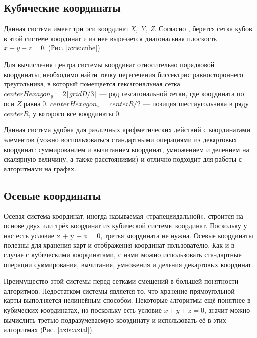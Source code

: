 \subsection{Кубические координаты}
Данная система имеет три оси координат \textit{X, Y, Z}. Согласно \cite{red}, берется сетка кубов в этой системе координат и из нее вырезается диагональная плоскость $x+y+z=0$. (Рис. \ref{axis:cube})

\par
Для вычисления центра системы координат относительно порядковой координаты, необходимо найти точку пересечения биссектрис равностороннего треугольника,  в который помещается гексагональная сетка.
$centerHexagon_{y} = 2\lfloor gridD / 3\rfloor $ --- ряд гексагональной сетки, где координата по оси $Z$ равна $0$.
$centerHexagon_{x} = centerR / 2 $ --- позиция шестиугольника в ряду $centerR$, у которого все координаты $0$.
\par Данная система удобна для различных арифметических действий с координатами элементов (можно воспользоваться стандартными операциями из декартовых координат: суммированием и вычитанием координат, умножением и делением на скалярную величину, а также расстояниями) и отлично подходит для работы с алгоритмами на графах.

\subsection{Осевые координаты}
Осевая система координат, иногда называемая «трапецеидальной», строится на основе двух или трёх координат из кубической системы координат. Поскольку у нас есть условие x + y + z = 0, третья координата не нужна. Осевые координаты полезны для хранения карт и отображения координат пользователю. Как и в случае с кубическими координатами, с ними можно использовать стандартные операции суммирования, вычитания, умножения и деления декартовых координат.\par
Преимущество этой системы перед сетками смещений в большей понятности алгоритмов. Недостатком системы является то, что хранение прямоугольной карты выполняется нелинейным способом. Некоторые алгоритмы ещё понятнее в кубических координатах, но поскольку есть условие $x + y + z = 0$, значит  можно вычислить третью подразумеваемую координату и использовать её в этих алгоритмах (Рис. \ref{axis:axial}).

